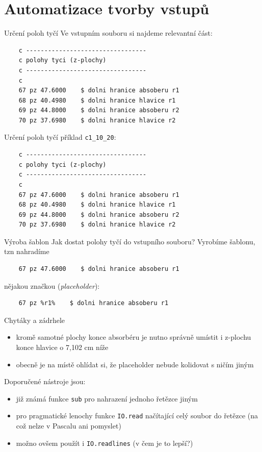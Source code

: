 \documentclass{beamer}
\begin{document}
\section{Automatizace tvorby vstupů}

\begin{frame}[fragile]{Určení poloh tyčí}
  Ve vstupním souboru si najdeme relevantní část:
  \scriptsize
  \begin{verbatim}
    c ---------------------------------
    c polohy tyci (z-plochy)
    c ---------------------------------
    c
    67 pz 47.6000    $ dolni hranice absoberu r1
    68 pz 40.4980    $ dolni hranice hlavice r1
    69 pz 44.8000    $ dolni hranice absoberu r2
    70 pz 37.6980    $ dolni hranice hlavice r2
  \end{verbatim}
\end{frame}

\begin{frame}[fragile]{Určení poloh tyčí}
  příklad \texttt{c1\_10\_20}:
  \scriptsize
  \begin{verbatim}
    c ---------------------------------
    c polohy tyci (z-plochy)
    c ---------------------------------
    c
    67 pz 47.6000    $ dolni hranice absoberu r1
    68 pz 40.4980    $ dolni hranice hlavice r1
    69 pz 44.8000    $ dolni hranice absoberu r2
    70 pz 37.6980    $ dolni hranice hlavice r2
  \end{verbatim}
\end{frame}

\begin{frame}[fragile]{Výroba šablon}
  Jak dostat polohy tyčí do vstupního souboru? Vyrobíme šablonu, tzn nahradíme
  \begin{verbatim}
    67 pz 47.6000    $ dolni hranice absoberu r1
  \end{verbatim}
  \pause
  nějakou značkou (\emph{placeholder}):
  \begin{verbatim}
    67 pz %r1%    $ dolni hranice absoberu r1
  \end{verbatim}
\end{frame}

\begin{frame}{Chytáky a zádrhele}
  \begin{itemize}
    \item kromě samotné plochy konce absorbéru je nutno správně umístit i z-plochu konce hlavice o 7,102 cm níže
    \item obecně je na místě ohlídat si, že placeholder nebude kolidovat s ničím jiným
  \end{itemize}
  Doporučené nástroje jsou:
  \begin{itemize}
    \item již známá funkce \texttt{sub} pro nahrazení jednoho řetězce jiným
    \item pro pragmatické lenochy funkce \texttt{IO.read} načítající celý soubor do řetězce (na což nelze v Pascalu ani pomyslet)
    \item možno ovšem použít i \texttt{IO.readlines} (v čem je to lepší?)
  \end{itemize}
\end{frame}
\end{document}
